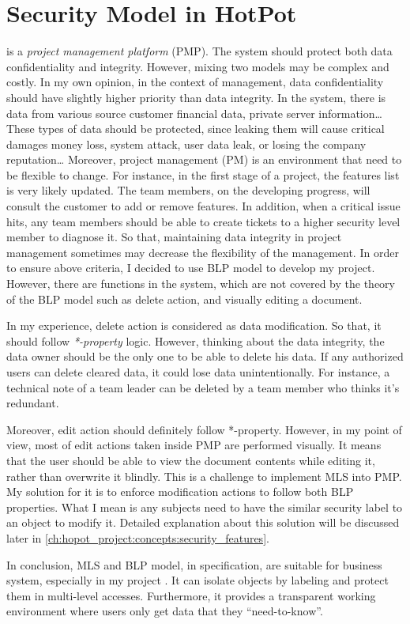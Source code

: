 
\section{Security Model in HotPot}
\label{ch:background:security_model_in_hotpot}

\myProject is a \emph{project management platform} (PMP).
The system should protect both data confidentiality and integrity.
However, mixing two models may be complex and costly.
In my own opinion, in the context of management, data confidentiality should have slightly higher priority than data integrity.
In the system, there is data from various source \eg customer financial data, private server information\dots
These types of data should be protected, since leaking them will cause critical damages \eg money loss, system attack, user data leak, or losing the company reputation\dots 
Moreover, project management (PM) is an environment that need to be flexible to change. 
For instance, in the first stage of a project, the features list is very likely updated.
The team members, on the developing progress, will consult the customer to add or remove features.
In addition, when a critical issue hits, any team members should be able to create tickets to a higher security level member to diagnose it.
So that, maintaining data integrity in project management sometimes may decrease the flexibility of the management.
In order to ensure above criteria, I decided to use BLP model to develop my project.
However, there are functions in the system, which are not covered by the theory of the BLP model such as delete action, and visually editing a document.

In my experience, delete action is considered as data modification.
So that, it should follow \emph{*-property} logic.
However, thinking about the data integrity, the data owner should be the only one to be able to delete his data.
If any authorized users can delete cleared data, it could lose data unintentionally.
For instance, a technical note of a team leader can be deleted by a team member who thinks it's redundant.

Moreover, edit action should definitely follow *-property.
However, in my point of view, most of edit actions taken inside PMP are performed visually.
It means that the user should be able to view the document contents while editing it, rather than overwrite it blindly.
This is a challenge to implement MLS into PMP.
My solution for it is to enforce modification actions to follow both BLP properties.
What I mean is any subjects need to have the similar security label to an object to modify it.
Detailed explanation about this solution will be discussed later in \autoref{ch:hopot_project:concepts:security_features}.

In conclusion, MLS and BLP model, in specification, are suitable for business system, especially in my project \myProject.
It can isolate objects by labeling and protect them in multi-level accesses.
Furthermore, it provides a transparent working environment where users only get data that they ``need-to-know''.
